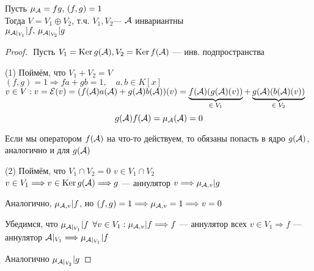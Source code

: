 \begin{lemma}
    Пусть $\mu_{\mathcal{A}} = fg, \, (f, g) = 1$ \\
    Тогда $V = V_1 \oplus V_2$, т.ч. $V_1, V_2 $--- $\mathcal{A}$ инвариантны \\
    $\mu_{\mathcal{A} |_{V_1}} | f, \, \mu_{\mathcal{A} |_{V_2}} | g$

    \begin{proof}
        $ $ \newline
        Пусть $ V_1 = \operatorname{Ker}  g(\mathcal{A}), V_2 = \operatorname{Ker} f(\mathcal{A})$ --- инв. подпространства

        \quad (1) Поймём, что $V_1 + V_2 = V$ \\
        $(f, g) = 1 \Longrightarrow fa + gb = 1, \quad a, b \in K[x]$ \\
        $v \in V: v = \mathcal{E}(v) = (f(\mathcal{A})a(\mathcal{A}) + g(\mathcal{A})b(\mathcal{A}))(v) = \underbrace{f(\mathcal{A})(g(\mathcal{A})(v))}_{\text{$ \in V_1 $}}  + \underbrace{g(\mathcal{A}) (b(\mathcal{A})(v))}_{\text{$ \in V_2 $}}  $ \\

        \[ g(\mathcal{A})f(\mathcal{A}) = \mu_{\mathcal{A}} (\mathcal{A}) = 0 \]

        Если мы оператором $f(\mathcal{A})$ на что-то действуем, то обязаны попасть в ядро $g(\mathcal{A})$, аналогично и для $g(\mathcal{A})$

        \quad (2) Поймём, что $V_1 \cap V_2 = 0$
        $ v \in V_1 \cap V_2 $ \\
        $v \in V_1 \Longrightarrow v \in \operatorname{Ker} g(\mathcal{A}) \Longrightarrow g$ --- аннулятор $v \Longrightarrow \mu_{\mathcal{A}, v} | g$

        Аналогично, $\mu_{\mathcal{A}, v} | f$, но $(f, g) = 1 \Longrightarrow \mu_{\mathcal{A}, v} = 1 \Longrightarrow v = 0$

        \quad Убедимся, что $ \mu_{\mathcal{A} |_{V_1}} | f $
        $\forall v \in V_1: \mu_{\mathcal{A}, v} | f \Longrightarrow f$ --- аннулятор всех $ v \in V_1 \Longrightarrow f$ --- аннулятор $\mathcal{A} |_{V_1} \Longrightarrow \mu_{\mathcal{A} |_{V_1}} | f$

        Аналогично $\mu_{\mathcal{A} |_{V_2}} | g$
    \end{proof} 
\end{lemma}